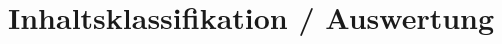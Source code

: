 \documentclass[11pt]{article}
\begin{document}



\section{Inhaltsklassifikation / Auswertung}
\end{document}
